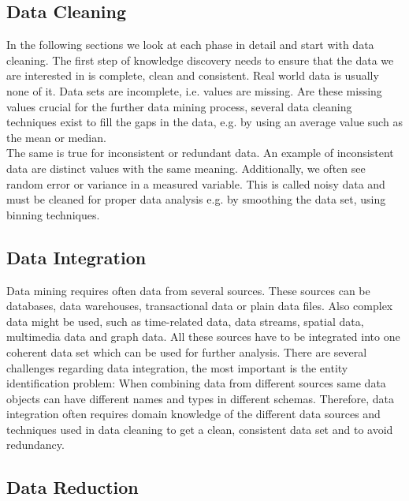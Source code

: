 \subsection{Data Cleaning} 
In the following sections we look at each phase in detail and start with data cleaning. The first step of knowledge discovery needs to ensure that the data we are interested in is complete, clean and consistent. Real world data is usually none of it. Data sets are incomplete, i.e. values are missing. Are these missing values crucial for the further data mining process, several data cleaning techniques exist to fill the gaps in the data, e.g. by using an average value such as the mean or median.
\\
The same is true for inconsistent or redundant data. An example of inconsistent data are distinct values with the same meaning. Additionally, we often see random error or variance in a measured variable. This is called noisy data and must be cleaned for proper data analysis e.g. by smoothing the data set, using binning techniques.


\subsection{Data Integration}

Data mining requires often data from several sources. These sources can be databases, data warehouses, transactional data or plain data files. Also complex data might be used, such as time-related data, data streams, spatial data, multimedia data and graph data. All these sources have to be integrated into one coherent data set which can be used for further analysis. There are several challenges regarding data integration, the most important is the entity identification problem: When combining data from different sources same data objects can have different names and types in different schemas. Therefore, data integration often requires domain knowledge of the different data sources and techniques used in data cleaning to get a clean, consistent data set and to avoid redundancy.


\subsection{Data Reduction}

